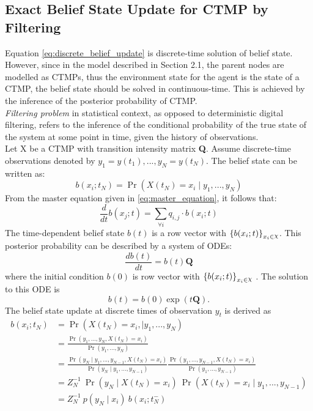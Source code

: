 \subsection{Exact Belief State Update for CTMP by Filtering}
\label{sec:filtering_CTMC}
Equation \ref{eq:discrete_belief_update} is discrete-time solution of belief state. However, since in the model described in Section 2.1, the parent nodes are modelled as CTMPs, thus the environment state for the agent is the state of a CTMP, the belief state should be solved in continuous-time. This is achieved by the inference of the posterior probability of CTMP. \cite{article}\\
\textit{Filtering problem} in statistical context, as opposed to deterministic digital filtering, refers to the inference of the conditional probability of the true state of the system at some point in time, given the history of observations. \cite{Godsill2019}\\
Let X be a CTMP with transition intensity matrix \textbf{Q}. Assume discrete-time observations denoted by $ y_{1}=y(t_{1}), ..., y_{N}=y(t_{N}) $. The belief state can be written as:
\begin{equation}
	b(x_{i};t_{N}) = \operatorname{Pr}(X(t_{N}) = x_{i} \mid y_{1}, ..., y_{N})
\end{equation}
From the master equation given in \autoref{eq:master_equation}, it follows that:
\begin{equation}
 \frac{d}{dt} b(x_{j};t)  = \sum_{\forall i} q_{i,j} \cdot b(x_{i};t)
\end{equation}
The time-dependent belief state $ b(t) $ is a row vector with $ \left\lbrace b(x_{i};t)\right\rbrace_{x_{i} \in \rchi}  $.
This posterior probability can be described by a system of ODEs:
\begin{equation}
\frac{db(t)}{dt} = b(t)\textbf{Q}
\end{equation}
where the initial condition $ b(0) $ is row vector with $ \left\lbrace b(x_{i};t)\right\rbrace_{x_{i} \in \rchi} $ \cite{article}. The solution to this ODE is
\begin{equation}
b(t) = b(0) \exp(t\textbf{Q}).
\label{eq:b_cont}
\end{equation}
The belief state update at discrete times of observation $ y_{t} $ is derived as 
\begin{align}
b(x_{i}; t_{N}) & = \operatorname{Pr}( X(t_{N}) = x_{i},\mid y_{1}, ..., y_{N}) \nonumber\\ & = \frac{\operatorname{Pr}(y_{1}, ..., y_{N}, X(t_{N}) = x_{i})}{\operatorname{Pr}(y_{1}, ..., y_{N})}  \nonumber\\ & = \frac{\operatorname{Pr}(y_{N} \mid y_{1}, ..., y_{N-1}, X(t_{N}) = x_{i})}{\operatorname{Pr}(y_{N} \mid y_{1}, ..., y_{N-1})} \frac{\operatorname{Pr}(y_{1}, ..., y_{N-1}, X(t_{N}) = x_{i})}{\operatorname{Pr}(y_{1}, ..., y_{N-1})}  \nonumber\\ & = Z_{N}^{-1} \ \operatorname{Pr}(y_{N} \mid X(t_{N})=x_{i})\ \operatorname{Pr}( X(t_{N}) = x_{i}\mid y_{1}, ..., y_{N-1})  \nonumber\\ & = Z_{N}^{-1}\ {p(y_{N} \mid x_{i})}\ {b(x_{i}; t_{N}^{-})}
\label{eq:b_jump}
\end{align}
